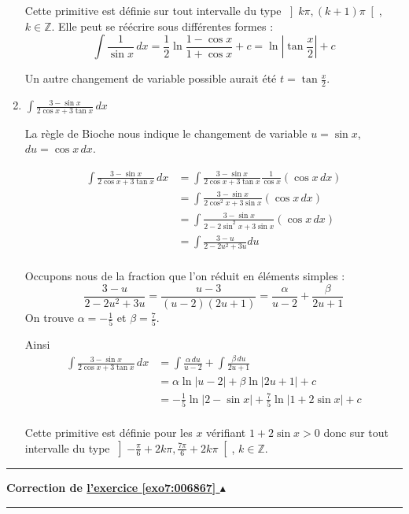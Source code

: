 \documentclass[11pt,a4paper]{article}
\newcommand{\Zz}{\mathbb{Z}} \newcommand{\Z}{\mathbb{Z}}
\newcounter{exo}
\newcommand{\correction}[1]{\hypertarget{cor7:#1}{}\label{cor7:#1}{\bf Correction de \hyperlink{exo7:#1}{l'exercice \ref{exo7:#1} $\blacktriangle$}}\vspace{1mm}\hrule\vspace{1mm}}
\newcommand{\fincorrection}{\vspace{1mm}\hrule\vspace*{7mm}}
\begin{document}
\begin{enumerate}
Cette primitive est définie sur tout intervalle du type $\left] k\pi ,\left(
k+1\right) \pi \right[ $, $k \in \Zz$.
Elle peut se réécrire sous différentes formes :
$$\int \frac 1{\sin x} \, dx = \frac 12 \ln \frac{1-\cos x}{1+\cos x} +c= \ln \left| \tan \frac x2\right| +c$$

Un autre changement de variable possible aurait été $t=\tan \frac x2$.

  \item $\int \frac{3-\sin x}{2\cos x+3\tan x}\,dx$

La règle de Bioche nous indique le changement de variable $u =\sin x$, $du = \cos x \, dx$.

\begin{align*}
\int \frac{3-\sin x}{2\cos x+3\tan x}\,dx  
  &= \int \frac{3-\sin x}{2\cos x+3\tan x}\frac{1}{\cos x}(\cos x \,dx) \\
  &= \int \frac{3-\sin x}{2\cos^2 x+3\sin x}(\cos x \,dx) \\
  &= \int \frac{3-\sin x}{2-2\sin^2 x+3\sin x}(\cos x \,dx) \\
  &= \int \frac{3-u}{2-2u^2 +3u} du \\ 
\end{align*}

Occupons nous de la fraction que l'on réduit en éléments simples :
$$\frac{3-u}{2-2u^2 +3u} = \frac{u-3}{(u-2)(2u+1)} = \frac{\alpha}{u-2}+\frac{\beta}{2u+1}$$
On trouve $\alpha = -\frac 15$ et $\beta = \frac 75$.

Ainsi 
\begin{align*}
\int \frac{3-\sin x}{2\cos x+3\tan x}\,dx  
  &=  \int \frac{\alpha \, du}{u-2}+\int\frac{\beta\, du}{2u+1}  \\ 
  &= \alpha \ln |u-2| + \beta \ln |2u+1| + c \\
  &= -\frac 15\ln |2-\sin x| + \frac 75 \ln |1+2\sin x| + c \\
\end{align*}

Cette primitive est définie pour les $x$ vérifiant $1+2\sin x >0$ donc sur tout intervalle du type $\left] -\frac\pi6 + 2k\pi , \frac{7\pi}{6} + 2k\pi\right[ $, $k \in \Zz$.
\end{enumerate}
\fincorrection
\correction{006867}
\end{document}
